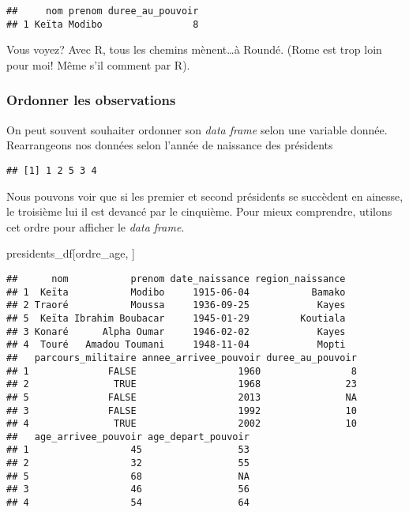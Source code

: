 \documentclass[]{book}
\newenvironment{Shaded}{\begin{snugshade}}{\end{snugshade}}
\newcommand{\KeywordTok}[1]{\textcolor[rgb]{0.13,0.29,0.53}{\textbf{#1}}}
\newcommand{\StringTok}[1]{\textcolor[rgb]{0.31,0.60,0.02}{#1}}
\newcommand{\OperatorTok}[1]{\textcolor[rgb]{0.81,0.36,0.00}{\textbf{#1}}}
\newcommand{\NormalTok}[1]{#1}
\begin{document}
\begin{verbatim}
##     nom prenom duree_au_pouvoir
## 1 Keïta Modibo                8
\end{verbatim}

Vous voyez? Avec R, tous les chemins mènent\ldots{}à Roundé. (Rome est
trop loin pour moi! Même s'il comment par R).

\subsubsection{Ordonner les
observations}\label{ordonner-les-observations}

On peut souvent souhaiter ordonner son \emph{data frame} selon une
variable donnée. Rearrangeons nos données selon l'année de naissance des
présidents

\begin{Shaded}
\end{Shaded}

\begin{verbatim}
## [1] 1 2 5 3 4
\end{verbatim}

Nous pouvons voir que si les premier et second présidents se succèdent
en ainesse, le troisième lui il est devancé par le cinquième. Pour mieux
comprendre, utilons cet ordre pour afficher le \emph{data frame}.

\begin{Shaded}
\begin{Highlighting}[]
\NormalTok{presidents_df[ordre_age, ]}
\end{Highlighting}
\end{Shaded}

\begin{verbatim}
##      nom           prenom date_naissance region_naissance
## 1  Keïta           Modibo     1915-06-04           Bamako
## 2 Traoré           Moussa     1936-09-25            Kayes
## 5  Keïta Ibrahim Boubacar     1945-01-29         Koutiala
## 3 Konaré      Alpha Oumar     1946-02-02            Kayes
## 4  Touré   Amadou Toumani     1948-11-04            Mopti
##   parcours_militaire annee_arrivee_pouvoir duree_au_pouvoir
## 1              FALSE                  1960                8
## 2               TRUE                  1968               23
## 5              FALSE                  2013               NA
## 3              FALSE                  1992               10
## 4               TRUE                  2002               10
##   age_arrivee_pouvoir age_depart_pouvoir
## 1                  45                 53
## 2                  32                 55
## 5                  68                 NA
## 3                  46                 56
## 4                  54                 64
\end{verbatim}
\end{document}
